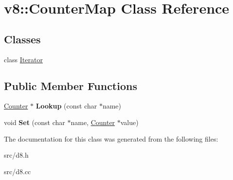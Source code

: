 \hypertarget{classv8_1_1_counter_map}{}\section{v8\+:\+:Counter\+Map Class Reference}
\label{classv8_1_1_counter_map}
\subsection*{Classes}
\begin{DoxyCompactItemize}
\item 
class \hyperlink{classv8_1_1_counter_map_1_1_iterator}{Iterator}
\end{DoxyCompactItemize}
\subsection*{Public Member Functions}
\begin{DoxyCompactItemize}
\item 
\hypertarget{classv8_1_1_counter_map_a9f591297e34d28b0e0e8f19e0629cc70}{}\hyperlink{classv8_1_1_counter}{Counter} $\ast$ {\bfseries Lookup} (const char $\ast$name)\label{classv8_1_1_counter_map_a9f591297e34d28b0e0e8f19e0629cc70}

\item 
\hypertarget{classv8_1_1_counter_map_a9a16f9691b16fd40e6fa6b1d5f3cf799}{}void {\bfseries Set} (const char $\ast$name, \hyperlink{classv8_1_1_counter}{Counter} $\ast$value)\label{classv8_1_1_counter_map_a9a16f9691b16fd40e6fa6b1d5f3cf799}

\end{DoxyCompactItemize}


The documentation for this class was generated from the following files\+:\begin{DoxyCompactItemize}
\item 
src/d8.\+h\item 
src/d8.\+cc\end{DoxyCompactItemize}
